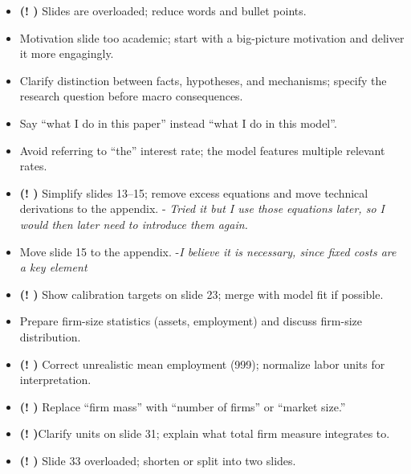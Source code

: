 \documentclass[12pt]{article}
\begin{document}
\begin{itemize}
    \noindent \textbf{Leo's notes}
    \item \textbf{(! \checkmark)} Slides are overloaded; reduce words and bullet points.  
    \item Motivation slide too academic; start with a big-picture motivation and deliver it more engagingly.  
    \item Clarify distinction between facts, hypotheses, and mechanisms; specify the research question before macro consequences.  
    \item Say “what I do in this paper” instead “what I do in this model”. 
    \item Avoid referring to “the” interest rate; the model features multiple relevant rates.  
    \item \textbf{(! \checkmark)} Simplify slides 13–15; remove excess equations and move technical derivations to the appendix. - \textit{Tried it but I use those equations later, so I would then later need to introduce them again.}
    \item Move slide 15 to the appendix. -\textit{I believe it is necessary, since fixed costs are a key element}
    \item \textbf{(! \checkmark)}  Show calibration targets on slide 23; merge with model fit if possible.  
    \item Prepare firm-size statistics (assets, employment) and discuss firm-size distribution.  
    \item \textbf{(! \checkmark)} Correct unrealistic mean employment (999); normalize labor units for interpretation.  
    \item \textbf{(! \checkmark)} Replace “firm mass” with “number of firms” or “market size.”  
    \item \textbf{(! \checkmark)}Clarify units on slide 31; explain what total firm measure integrates to.  
    \item \textbf{(! \checkmark)} Slide 33 overloaded; shorten or split into two slides.

\end{itemize} \normalsize
\end{document}
